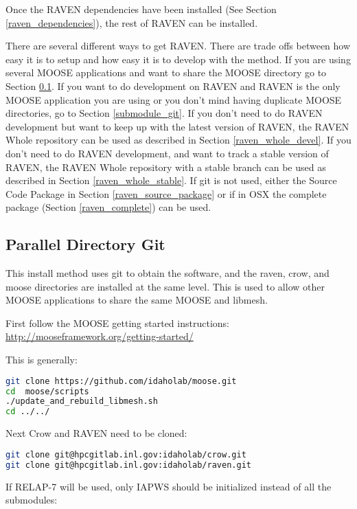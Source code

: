 Once the RAVEN dependencies have been installed (See Section
\ref{raven_dependencies}), the rest of RAVEN can be installed.

There are several different ways to get RAVEN.  There are trade offs
between how easy it is to setup and how easy it is to develop with the
method.  If you are using several MOOSE applications and want to share
the MOOSE directory go to Section \ref{parallel_directory_git}.  If
you want to do development on RAVEN and RAVEN is the only MOOSE
application you are using or you don't mind having duplicate MOOSE
directories, go to Section \ref{submodule_git}.  If you don't need to
do RAVEN development but want to keep up with the latest version of
RAVEN, the RAVEN Whole repository can be used as described in Section
\ref{raven_whole_devel}.  If you don't need to do RAVEN development,
and want to track a stable version of RAVEN, the RAVEN Whole
repository with a stable branch can be used as described in Section
\ref{raven_whole_stable}.  If git is not used, either the Source Code
Package in Section \ref{raven_source_package} or if in OSX the
complete package (Section \ref{raven_complete}) can be used.

\subsection{Parallel Directory Git}
\label{parallel_directory_git}

This install method uses git to obtain the software, and the raven,
crow, and moose directories are installed at the same level.  This is
used to allow other MOOSE applications to share the same MOOSE and
libmesh.

First follow the MOOSE getting started instructions:  \url{http://mooseframework.org/getting-started/}

This is generally:

\begin{lstlisting}[language=bash]
git clone https://github.com/idaholab/moose.git
cd  moose/scripts
./update_and_rebuild_libmesh.sh
cd ../../
\end{lstlisting}

Next Crow and RAVEN need to be cloned:

\begin{lstlisting}[language=bash]
git clone git@hpcgitlab.inl.gov:idaholab/crow.git
git clone git@hpcgitlab.inl.gov:idaholab/raven.git
\end{lstlisting}

If RELAP-7 will be used, only IAPWS should be initialized instead of
all the submodules:

